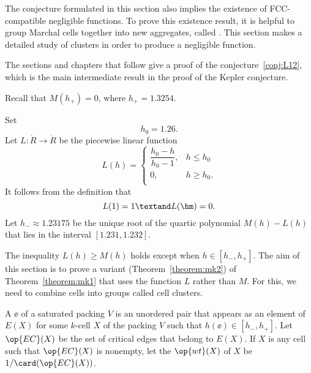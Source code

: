 The conjecture formulated in this section also implies the existence
of FCC-compatible negligible functions.  To prove this existence
result, it is helpful to group Marchal cells together into new
aggregates, called .  This section makes a detailed
study of clusters in order to produce a negligible function.

The sections and chapters that follow give a proof of the
conjecture~\ref{conj:L12},  which is the
main intermediate result in the proof of the Kepler
conjecture.


Recall that $M(h_+) = 0$, where   $h_+ = 1.3254$.
%

\begin{definition}[$L$,~$h_0$,~$h_-$]\label{def:L} 
Set
\[  
h_0 = 1.26.%
\] 
Let $L:\ring{R}\to\ring{R}$ be the piecewise linear function 
\[  
L(h) = \begin{cases} 
\dfrac{h_0-h}{h_0-1}, & h \le h_0 \\
0, & h\ge h_0. \\
\end{cases}
\] 
It follows from the definition that
\[  
L(1) = 1\textand  L(\hm) = 0.
\] 
Let $h_- \approx 1.23175$ be the unique root of the quartic polynomial
$M(h)-L(h)$ that lies in the interval $[1.231,1.232]$.
%
%
%
\end{definition}

\bjliekb

The inequality $L(h)\ge M(h)$ holds except when $h\in [h_-,h_+]$.  The
aim of this section is to prove a variant (Theorem~\ref{theorem:mk2})
of Theorem~\ref{theorem:mk1} that uses the function $L$ rather than
$M$.  For this, we need to combine cells into groups called cell
clusters.

\begin{definition}\label{def:wt} 
  A  $\ee$ of a saturated packing $V$ is an
  unordered pair that appears as an element of $E(X)$ for some
  $k$-cell $X$ of the packing $V$ such that $h(\ee)\in[h_-,h_+]$.  Let
  $\op{EC}(X)$ be the set of critical edges that belong to $E(X)$.  If
  $X$ is any cell such that $\op{EC}(X)$ is nonempty, let the
   $\op{wt}(X)$ of $X$ be $1/\card(\op{EC}(X))$.
\end{definition}
%
%
%

